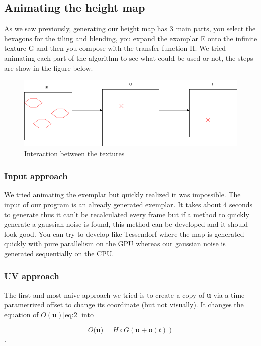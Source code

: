 \documentclass{article}
\begin{document}
\subsection{Animating the height map}
As we saw previously, generating our height map has 3 main parts, you select the hexagons for the tiling and blending, you expand the examplar E onto the infinite texture G and then you compose with the transfer function H. We tried animating each part of the algorithm to see what could be used or not, the steps are show in the figure below.
\begin{figure}[H]\label{sch:1}
    \centering
    \includegraphics[width=15cm,keepaspectratio]{images/schema.png}
    \caption{Interaction between the textures}
\end{figure}

\subsubsection{Input approach}
We tried animating the exemplar but quickly realized it was impossible. The input of our program is an already generated exemplar. It takes about 4 seconds to generate thus it can't be recalculated every frame but if a method to quickly generate a gaussian noise is found, this method can be developed and it should look good. You can try to develop like Tessendorf\cite{tessendorf2001simulating} where the map is generated quickly with pure parallelism on the GPU whereas our gaussian noise is generated sequentially on the CPU.
\subsubsection{UV approach} 
The first and most naive approach we tried is to create a copy of \textbf{u} via a time-parametrized offset to change its coordinate (but not visually). It changes the equation of $O(\textbf{u})$\ref{eq:2} into

\begin{equation}
    O(\textbf{u)} = H \circ G(\textbf{u}+\textbf{o}(t))
\end{equation}.
\end{document}
